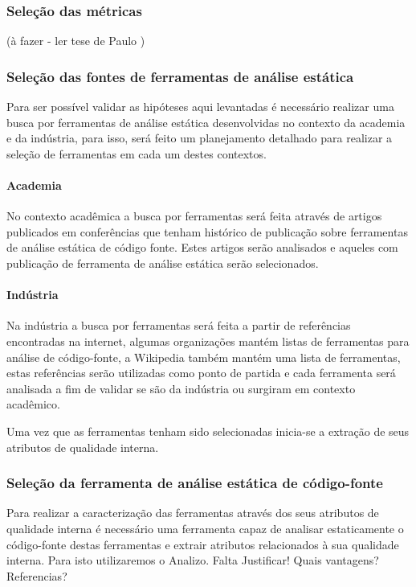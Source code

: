 \documentclass[12pt]{article}
\begin{document}
\subsubsection{Seleção das métricas}

(à fazer - ler tese de Paulo \cite{Meirelles2013})

\subsubsection{Seleção das fontes de ferramentas de análise estática}

Para ser possível validar as hipóteses aqui levantadas é necessário realizar
uma busca por ferramentas de análise estática desenvolvidas no contexto da
academia e da indústria, para isso, será feito um planejamento detalhado para
realizar a seleção de ferramentas em cada um destes contextos.

\paragraph{Academia} No contexto acadêmica a busca por ferramentas será feita
através de artigos publicados em conferências que tenham histórico de
publicação sobre ferramentas de análise estática de código fonte. Estes
artigos serão analisados e aqueles com publicação de ferramenta de análise
estática serão selecionados.

\paragraph{Indústria} Na indústria a busca por ferramentas será feita a partir
de referências encontradas na internet, algumas organizações mantém listas de
ferramentas para análise de código-fonte, a Wikipedia também mantém uma lista
de ferramentas, estas referências serão utilizadas como ponto de partida e
cada ferramenta será analisada a fim de validar se são da indústria ou
surgiram em contexto acadêmico.

Uma vez que as ferramentas tenham sido selecionadas inicia-se a extração de
seus atributos de qualidade interna.

\subsubsection{Seleção da ferramenta de análise estática de código-fonte}

Para realizar a caracterização das ferramentas através dos seus atributos de
qualidade interna é necessário uma ferramenta capaz de analisar estaticamente
o código-fonte destas ferramentas e extrair atributos relacionados à sua
qualidade interna. Para isto utilizaremos o Analizo\cite{Terceiro2010}. Falta
Justificar! Quais vantagens? Referencias?
\end{document}
